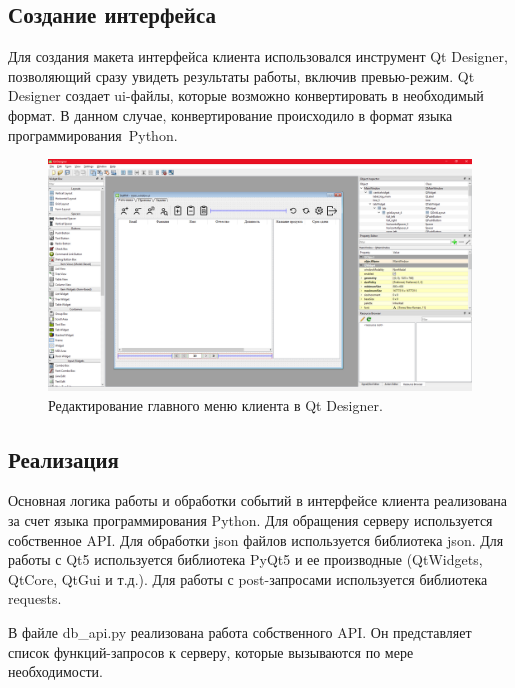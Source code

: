 \documentclass[14pt, a4paper]{extarticle}
\begin{document}
    \clearpage
    \subsection{Создание интерфейса}
    Для создания макета интерфейса клиента использовался инструмент Qt Designer, позволяющий сразу увидеть результаты работы, включив превью-режим. Qt Designer создает ui-файлы, которые возможно конвертировать в необходимый формат. В данном случае, конвертирование происходило в формат языка программирования Python.
    
    \begin{figure}[h]
        \centering
        \includegraphics[width=1\linewidth]{img/qtdesigner.png}
        \caption{Редактирование главного меню клиента в Qt Designer.}
        \label{fig:qtdesigner}
    \end{figure}


    \clearpage
    \subsection{Реализация}
    Основная логика работы и обработки событий в интерфейсе клиента реализована за счет языка программирования Python. Для обращения серверу используется собственное API. Для обработки json файлов используется библиотека json. Для работы с Qt5 используется библиотека PyQt5 и ее производные (QtWidgets, QtCore, QtGui и т.д.). Для работы с post-запросами используется библиотека requests.

    В файле db\_api.py реализована работа собственного API. Он представляет список функций-запросов к серверу, которые вызываются по мере необходимости.
    
    
\end{document}
